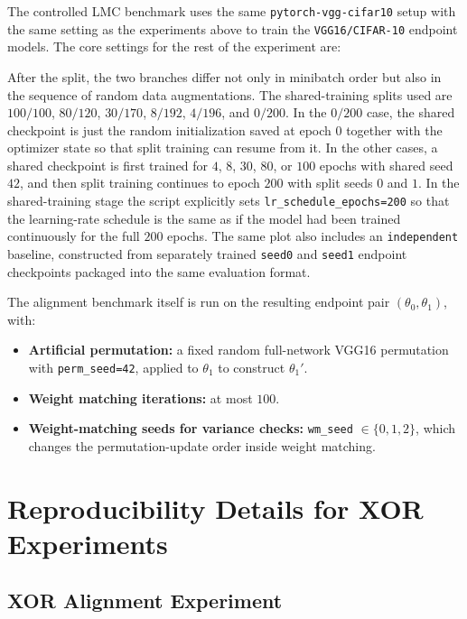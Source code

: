 \documentclass[11pt,a4paper]{report}
\begin{document}
The controlled LMC benchmark uses the same \texttt{pytorch-vgg-cifar10} setup \citep{fu_pytorch_vgg_cifar10} with the same setting as the experiments above to train the \texttt{VGG16/CIFAR-10} endpoint models. The core settings for the rest of the experiment are:


After the split, the two branches differ not only in minibatch order but also in the sequence of random data augmentations. The shared-training splits used are \(100/100\), \(80/120\), \(30/170\), \(8/192\), \(4/196\), and \(0/200\). In the \(0/200\) case, the shared checkpoint is just the random initialization saved at epoch \(0\) together with the optimizer state so that split training can resume from it. In the other cases, a shared checkpoint is first trained for \(4\), \(8\), \(30\), \(80\), or \(100\) epochs with shared seed \(42\), and then split training continues to epoch \(200\) with split seeds \(0\) and \(1\). In the shared-training stage the script explicitly sets \texttt{lr\_schedule\_epochs=200} so that the learning-rate schedule is the same as if the model had been trained continuously for the full \(200\) epochs. The same plot also includes an \texttt{independent} baseline, constructed from separately trained \texttt{seed0} and \texttt{seed1} endpoint checkpoints packaged into the same evaluation format.

The alignment benchmark itself is run on the resulting endpoint pair \((\theta_0,\theta_1)\), with:
\begin{itemize}
    \item \textbf{Artificial permutation:} a fixed random full-network VGG16 permutation with \texttt{perm\_seed=42}, applied to \(\theta_1\) to construct \(\theta_1'\).
    \item \textbf{Weight matching iterations:} at most \(100\).
    \item \textbf{Weight-matching seeds for variance checks:} \texttt{wm\_seed} \(\in \{0,1,2\}\), which changes the permutation-update order inside weight matching.
\end{itemize}

\section{Reproducibility Details for XOR Experiments}
\label{app:xor_repro}

\subsection{XOR Alignment Experiment}
\end{document}
